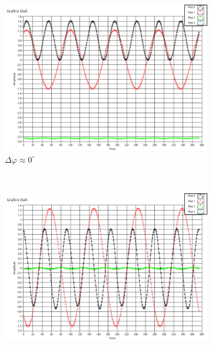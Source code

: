 \documentclass[a4paper]{article}
\begin{document}
\begin{figure}[!h]
    \centering
    
    ~ %
    \begin{subfigure}[b]{0.7\textwidth}
        \includegraphics[width=\textwidth]{es25_800hz_100nF_0deg}
        \caption{$\Delta \varphi \approx 0^{\circ}$}
        \label{fig:tiger}
    \end{subfigure}\quad
    ~ %
    \begin{subfigure}[b]{0.7\textwidth}
        \includegraphics[width=\textwidth]{es25_800hz_100nF_90deg}

\end{subfigure}
\end{figure}
\end{document}

